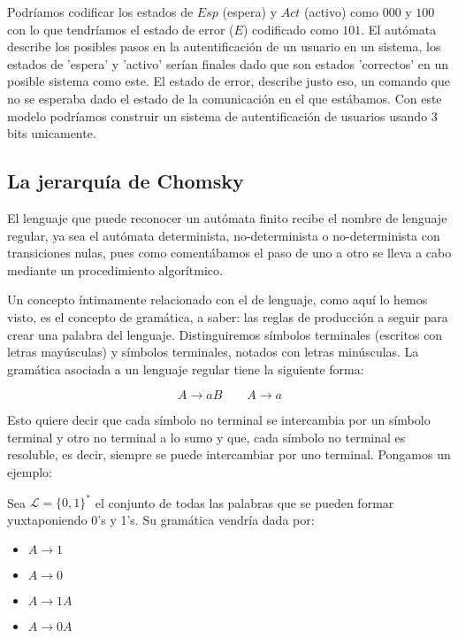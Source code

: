 Podríamos codificar los estados de $Esp$ (espera) y $Act$ (activo) como $000$ y $100$ con lo que tendríamos el estado de error ($E$) codificado como $101$. El autómata describe los posibles pasos en la autentificación de un usuario en un sistema, los estados de 'espera' y 'activo' serían finales dado que son estados 'correctos' en un posible sistema como este. El estado de error, describe justo eso, un comando que no se esperaba dado el estado de la comunicación en el que estábamos. Con este modelo podríamos construir un sistema de autentificación de usuarios usando 3 bits unicamente.


\subsection{La jerarquía de Chomsky}

El lenguaje que puede reconocer un autómata finito recibe el nombre de lenguaje regular, ya sea el autómata determinista, no-determinista o no-determinista con transiciones nulas, pues como comentábamos el paso de uno a otro se lleva a cabo mediante un procedimiento algorítmico. 

\vspace{10px}

Un concepto íntimamente relacionado con el de lenguaje, como aquí lo hemos visto, es el concepto de gramática, a saber: las reglas de producción a seguir para crear una palabra del lenguaje. Distinguiremos símbolos terminales (escritos con letras mayúsculas) y símbolos terminales, notados con letras minúsculas. La gramática asociada a un lenguaje regular tiene la siguiente forma:


$$ A \rightarrow a B \quad \quad A \rightarrow a$$ 

Esto quiere decir que cada símbolo no terminal se intercambia por un símbolo terminal y otro no terminal a lo sumo y que, cada símbolo no terminal es resoluble, es decir, siempre se puede intercambiar por uno terminal. Pongamos un ejemplo: 

\vspace{10px}

Sea $\mathcal{L}=\{0,1\}^*$ el conjunto de todas las palabras que se pueden formar yuxtaponiendo 0's y 1's. Su gramática vendría dada por:


\begin{multicols}{2}
	\begin{itemize}
		\item $A \rightarrow 1$
		\item $A \rightarrow 0$
		\item $A \rightarrow 1A$
		\item $A \rightarrow 0A$  
	\end{itemize}
\end{multicols}


